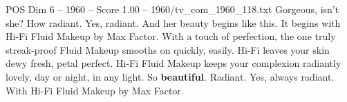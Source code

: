 \begin{textsample}{POS Dim 6 – 1960 – Score 1.00 – 1960/tv\_com\_1960\_118.txt}  \label{ex:f6_pos_028}
Gorgeous, isn't she?
How radiant.
Yes, radiant.
And her beauty begins like this.
It begins with Hi-Fi Fluid Makeup by Max Factor.
With a touch of perfection, the one truly streak-proof Fluid Makeup smooths on quickly, easily.
Hi-Fi leaves your skin dewy fresh, petal perfect.
Hi-Fi Fluid Makeup keeps your complexion radiantly lovely, day or night, in any light.
So \textbf{beautiful}.
Radiant.
Yes, always radiant.
With Hi-Fi Fluid Makeup by Max Factor.

\end{textsample}
